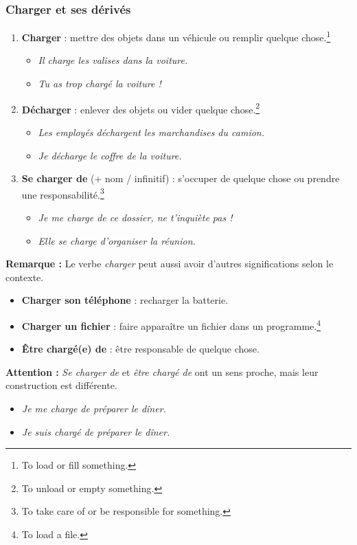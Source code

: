 \documentclass[math,code]{amznotes}
\theoremstyle{remark}
\begin{document}
\subsubsection*{Charger et ses dérivés}

\begin{enumerate}
    \item \textbf{Charger} : mettre des objets dans un véhicule ou remplir quelque chose.\footnote{To load or fill something.}
    \begin{itemize}
        \item \textit{Il charge les valises dans la voiture.}
        \item \textit{Tu as trop chargé la voiture !}
    \end{itemize}

    \item \textbf{Décharger} : enlever des objets ou vider quelque chose.\footnote{To unload or empty something.}
    \begin{itemize}
        \item \textit{Les employés déchargent les marchandises du camion.}
        \item \textit{Je décharge le coffre de la voiture.}
    \end{itemize}

    \item \textbf{Se charger de} (+ nom / infinitif) : s'occuper de quelque chose ou prendre une responsabilité.\footnote{To take care of or be responsible for something.}
    \begin{itemize}
        \item \textit{Je me charge de ce dossier, ne t'inquiète pas !}
        \item \textit{Elle se charge d'organiser la réunion.}
    \end{itemize}
\end{enumerate}

\begin{notebox}
\textbf{Remarque :} Le verbe \textit{charger} peut aussi avoir d'autres significations selon le contexte.

\begin{itemize}
    \item \textbf{Charger son téléphone} : recharger la batterie.
    \item \textbf{Charger un fichier} : faire apparaître un fichier dans un programme.\footnote{To load a file.}
    \item \textbf{Être chargé(e) de} : être responsable de quelque chose.
\end{itemize}

\textbf{Attention :} \textit{Se charger de} et \textit{être chargé de} ont un sens proche, mais leur construction est différente.

\begin{itemize}
    \item \textit{Je me charge de préparer le dîner.}
    \item \textit{Je suis chargé de préparer le dîner.}
\end{itemize}
\end{notebox}
\end{document}
